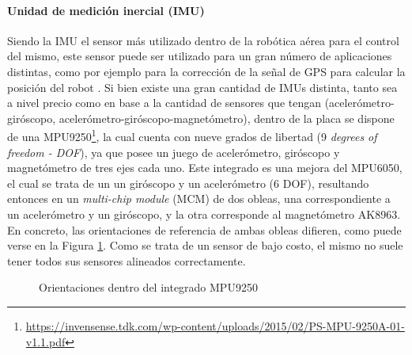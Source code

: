 \paragraph{Unidad de medición inercial (IMU)}
Siendo la IMU el sensor más utilizado dentro de la robótica aérea para el control del mismo, este sensor puede ser utilizado para un gran número de aplicaciones distintas, como por ejemplo para la corrección de la señal de GPS para calcular la posición del robot \cite{kok2017}. Si bien existe una gran cantidad de IMUs distinta, tanto sea a nivel precio como en base a la cantidad de sensores que tengan (acelerómetro-giróscopo, acelerómetro-giróscopo-magnetómetro), dentro de la placa se dispone de una MPU9250\footnote{\url{https://invensense.tdk.com/wp-content/uploads/2015/02/PS-MPU-9250A-01-v1.1.pdf}}, la cual cuenta con nueve grados de libertad (9 \textit{degrees of freedom - DOF}), ya que posee un juego de acelerómetro, giróscopo y magnetómetro de tres ejes cada uno. Este integrado es una mejora del MPU6050, el cual se trata de un un giróscopo y un acelerómetro (6 DOF), resultando entonces en un \textit{multi-chip module} (MCM) de dos obleas, una correspondiente a un acelerómetro y un giróscopo, y la otra corresponde al magnetómetro AK8963. En concreto, las orientaciones de referencia de ambas obleas difieren, como puede verse en la Figura \ref{fig:mpu9250orientations}. Como se trata de un sensor de bajo costo, el mismo no suele tener todos sus sensores alineados correctamente.
\begin{figure}
    \centering
    \qquad
    \caption{Orientaciones dentro del integrado MPU9250}
    \label{fig:mpu9250orientations}
\end{figure}

